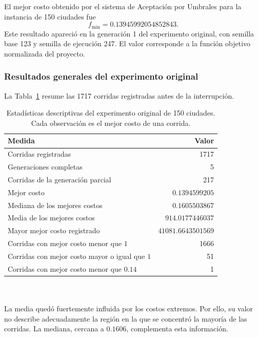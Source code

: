 \documentclass[12pt]{article}
\begin{document}
El mejor costo obtenido por el sistema de Aceptación por Umbrales
para la instancia de 150 ciudades fue
\[    \boxed{f_{\min}=0.13945992054852843}.
\]
Este resultado apareció en la generación 1 del experimento original,
con semilla base 123 y semilla de ejecución 247. El valor corresponde a la función objetivo normalizada del proyecto.

\subsubsection{Resultados generales del experimento original}

La Tabla~\ref{tab:resultados150-general} resume las 1717 corridas
registradas antes de la interrupción.
\begin{table}[htbp]
    \centering
    \small
    \begin{tabular}{lr}
        \hline
        Medida & Valor \\
        \hline
        Corridas registradas & 1717 \\
        Generaciones completas & 5 \\
        Corridas de la generación parcial & 217 \\
        Mejor costo & $0.1394599205$ \\
        Mediana de los mejores costos & $0.1605503867$ \\
        Media de los mejores costos & $914.0177446037$ \\
        Mayor mejor costo registrado & $41081.6643501569$ \\
        Corridas con mejor costo menor que $1$ & 1666 \\
        Corridas con mejor costo mayor o igual que $1$ & 51 \\
        Corridas con mejor costo menor que $0.14$ & 1 \\
        \hline
    \end{tabular}
    \caption{Estadísticas descriptivas del experimento original
    de 150 ciudades. Cada observación es el mejor costo de una corrida.}
    \label{tab:resultados150-general}
\end{table}
\\\\
La media quedó fuertemente influida por los costos extremos.
Por ello, su valor no describe adecuadamente la región en la que se
concentró la mayoría de las corridas. La mediana, cercana a $0.1606$,
complementa esta información.
\\\\
\end{document}
